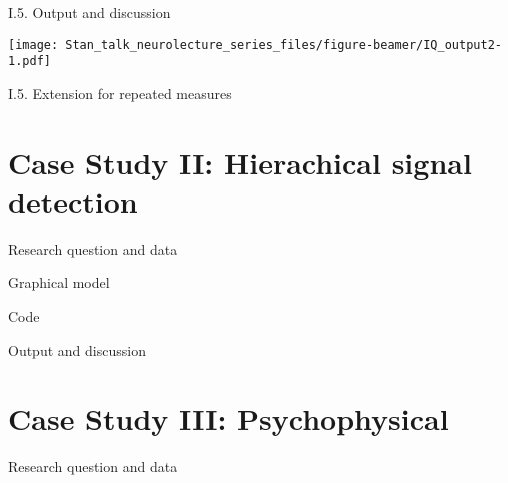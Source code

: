 \documentclass[ignorenonframetext,]{beamer}
\begin{document}
\begin{frame}{%
\protect\hypertarget{i.5.-output-and-discussion}{%
I.5. Output and discussion}}

\texttt{[image: Stan\_talk\_neurolecture\_series\_files/figure-beamer/IQ\_output2-1.pdf]}

\end{frame}

\begin{frame}{%
\protect\hypertarget{i.5.-extension-for-repeated-measures}{%
I.5. Extension for repeated measures}}

\end{frame}

\hypertarget{case-study-ii-hierachical-signal-detection}{%
\section{Case Study II: Hierachical signal
detection}\label{case-study-ii-hierachical-signal-detection}}

\begin{frame}{%
\protect\hypertarget{research-question-and-data}{%
Research question and data}}

\end{frame}

\begin{frame}{%
\protect\hypertarget{graphical-model}{%
Graphical model}}

\end{frame}

\begin{frame}{%
\protect\hypertarget{code}{%
Code}}

\end{frame}

\begin{frame}{%
\protect\hypertarget{output-and-discussion}{%
Output and discussion}}

\end{frame}

\hypertarget{case-study-iii-psychophysical}{%
\section{Case Study III:
Psychophysical}\label{case-study-iii-psychophysical}}

\begin{frame}{%
\protect\hypertarget{research-question-and-data-1}{%
Research question and data}}

\end{frame}
\end{document}
